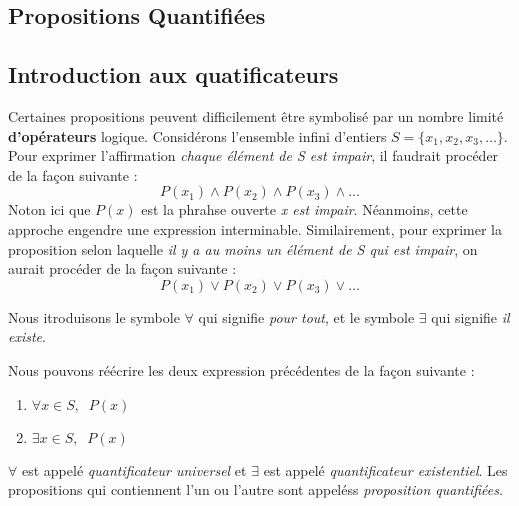 \documentclass[16pt]{report}
\begin{document}
\begin{multicols*}{2}
            
\chapter{Propositions Quantifiées}

            \section{Introduction aux quatificateurs}
            Certaines propositions peuvent difficilement être symbolisé par un nombre limité 
            \textbf{d'opérateurs} logique. Considérons l'ensemble infini d'entiers $S = \{x_1, x_2, x_3, \dots \}$.
            Pour exprimer l'affirmation \textit{chaque élément de S est impair}, il faudrait procéder 
            de la façon suivante : 
            \[ P(x_1) \land P(x_2) \land P(x_3) \land \dots \]
            Noton ici que $P(x)$ est la phrahse ouverte \textit{x est impair}.  
            Néanmoins, cette approche engendre une expression interminable. Similairement, pour exprimer la proposition 
            selon laquelle \textit{il y a au moins un élément de S qui est impair}, on aurait 
            procéder de la façon suivante : 
            \[ P(x_1) \lor P(x_2) \lor P(x_3) \lor \dots \]
            
            
            \begin{Concept}{}{}
                Nous itroduisons le symbole $\forall$ qui signifie \textit{pour tout}, et le symbole 
                $\exists$ qui signifie \textit{il existe}.   
            \end{Concept}
            
            Nous pouvons réécrire les deux expression précédentes de la façon suivante : 
            \begin{enumerate}
                \item $\forall x \in S, \;\; P(x)$ 
                \item $\exists x \in S, \;\; P(x)$  
            \end{enumerate}


            \begin{note}{}{}
                $\forall$ est appelé \textit{quantificateur universel} et $\exists$ est appelé 
                \textit{quantificateur existentiel}. Les propositions qui contiennent l'un ou l'autre sont appeléss 
                \textit{proposition quantifiées}. 
            \end{note} 
            


\end{multicols*}
\end{document}
